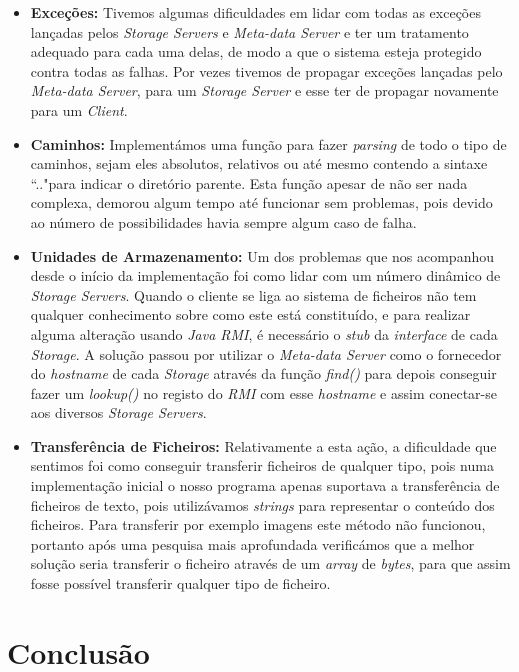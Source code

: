 \documentclass{article}
\begin{document}
\begin{itemize}
\item \textbf{Exceções:} Tivemos algumas dificuldades em lidar com todas as exceções lançadas pelos \textit{Storage Servers} e \textit{Meta-data Server} e ter um tratamento adequado para cada uma delas, de modo a que o sistema esteja protegido contra todas as falhas. Por vezes tivemos de propagar exceções lançadas pelo \textit{Meta-data Server}, para um \textit{Storage Server} e esse ter de propagar novamente para um \textit{Client}.
\item \textbf{Caminhos:} Implementámos uma função para fazer \textit{parsing} de todo o tipo de caminhos, sejam eles absolutos, relativos ou até mesmo contendo a sintaxe ``.."\space para indicar o diretório parente. Esta função apesar de não ser nada complexa, demorou algum tempo até funcionar sem problemas, pois devido ao número de possibilidades havia sempre algum caso de falha.
\item \textbf{Unidades de Armazenamento:} Um dos problemas que nos acompanhou desde o início da implementação foi como lidar com um número dinâmico de \textit{Storage Servers}. Quando o cliente se liga ao sistema de ficheiros não tem qualquer conhecimento sobre como este está constituído, e para realizar alguma alteração usando \textit{Java RMI}, é necessário o \textit{stub} da \textit{interface} de cada \textit{Storage}. A solução passou por utilizar o \textit{Meta-data Server} como o fornecedor do \textit{hostname} de cada \textit{Storage} através da função \textit{find()} para depois conseguir fazer um \textit{lookup()} no registo do \textit{RMI} com esse \textit{hostname} e assim conectar-se aos diversos \textit{Storage Servers}.
\item \textbf{Transferência de Ficheiros:} Relativamente a esta ação, a dificuldade que sentimos foi como conseguir transferir ficheiros de qualquer tipo, pois numa implementação inicial o nosso programa apenas suportava a transferência de ficheiros de texto, pois utilizávamos \textit{strings} para representar o conteúdo dos ficheiros. Para transferir por exemplo imagens este método não funcionou, portanto após uma pesquisa mais aprofundada verificámos que a melhor solução seria transferir o ficheiro através de um \textit{array} de \textit{bytes}, para que assim fosse possível transferir qualquer tipo de ficheiro.
\end{itemize}

\section{Conclusão}
\end{document}
